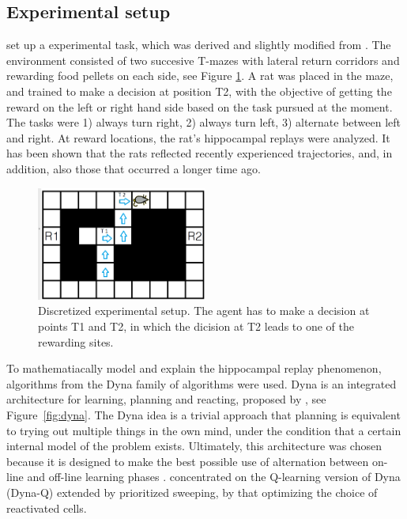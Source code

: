 \documentclass[a4paper]{article}
\begin{document}
\subsection{Experimental setup}
\par \cite{NeuralDynaQ} set up a experimental task, which was derived and slightly modified from \cite{GUPTA2010695}. The environment consisted of two succesive T-mazes with lateral return corridors and rewarding food pellets on each side, see Figure \ref{fig:setup}. A rat was placed in the maze, and trained to make a decision at position T2, with the objective of getting the reward on the left or right hand side based on the task pursued at the moment. The tasks were 1) always turn right, 2) always turn left, 3) alternate between left and right. At reward locations, the rat's hippocampal replays were analyzed. It has been shown that the rats reflected recently experienced trajectories, and, in addition, also those that occurred a longer time ago.
		
\begin{figure}[t]
	\centering
	\includegraphics[angle=0,width=0.5\textwidth]{./figs/setup.png}
	\caption{\label{fig:setup}Discretized experimental setup. The agent has to make a decision at points T1 and T2, in which the dicision at T2 leads to one of the rewarding sites. \citep{NeuralDynaQ}}
\end{figure}
		
\par To mathematiacally model and explain the hippocampal replay phenomenon, algorithms from the Dyna family of algorithms were used. Dyna is an integrated architecture for learning, planning and reacting, proposed by \cite{Dyna}, see Figure~\ref{fig:dyna}. The Dyna idea is a trivial approach that planning is equivalent to trying out multiple things in the own mind, under the condition that a certain internal model of the problem exists. Ultimately, this architecture was chosen because it is designed to make the best possible use of alternation between on-line and off-line learning phases \citep{Dyna}. \cite{NeuralDynaQ} concentrated on the Q-learning version of Dyna (Dyna-Q) extended by prioritized sweeping, by that optimizing the choice of reactivated cells.
\end{document}
